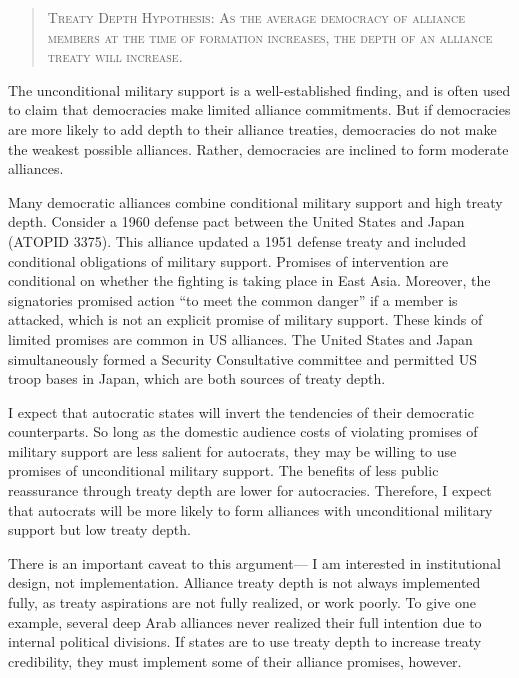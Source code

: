 \documentclass[12pt]{article}
\begin{document}
\begin{quote}
\textsc{Treaty Depth Hypothesis: As the average democracy of alliance members at the time of formation increases, the depth of an alliance treaty will increase.}
\end{quote} 


The unconditional military support is a well-established finding, and is often used to claim that democracies make limited alliance commitments. 
But if democracies are more likely to add depth to their alliance treaties, democracies do not make the weakest possible alliances. 
Rather, democracies are inclined to form moderate alliances. 


Many democratic alliances combine conditional military support and high treaty depth. 
Consider a 1960 defense pact between the United States and Japan (ATOPID 3375).
This alliance updated a 1951 defense treaty and included conditional obligations of military support. 
Promises of intervention are conditional on whether the fighting is taking place in East Asia. 
Moreover, the signatories promised action ``to meet the common danger'' if a member is attacked, which is not an explicit promise of military support. 
These kinds of limited promises are common in US alliances. 
The United States and Japan simultaneously formed a Security Consultative committee and permitted US troop bases in Japan, which are both sources of treaty depth. 


I expect that autocratic states will invert the tendencies of their democratic counterparts.
So long as the domestic audience costs of violating promises of military support are less salient for autocrats, they may be willing to use promises of unconditional military support. 
The benefits of less public reassurance through treaty depth are lower for autocracies. 
Therefore, I expect that autocrats will be more likely to form alliances with unconditional military support but low treaty depth. 


There is an important caveat to this argument--- I am interested in institutional design, not implementation.
Alliance treaty depth is not always implemented fully, as treaty aspirations are not fully realized, or work poorly. 
To give one example, several deep Arab alliances never realized their full intention due to internal political divisions.  
If states are to use treaty depth to increase treaty credibility, they must implement some of their alliance promises, however. 
\end{document}

